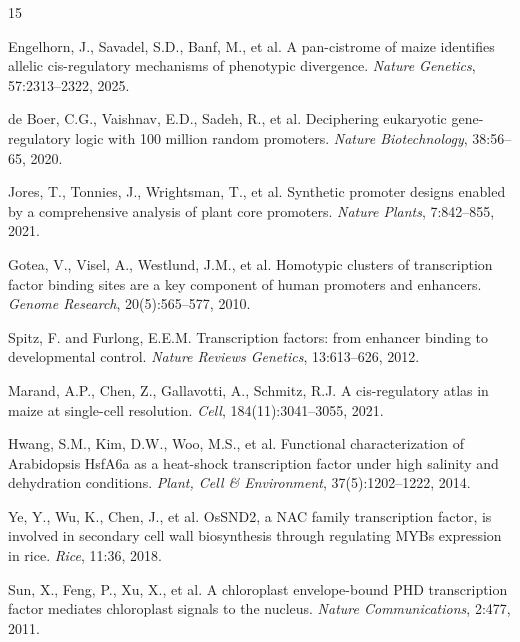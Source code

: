\documentclass[11pt,a4paper]{article}
\begin{document}

\begin{thebibliography}{15}

Engelhorn, J., Savadel, S.D., Banf, M., et al.
\newblock A pan-cistrome of maize identifies allelic cis-regulatory mechanisms of phenotypic divergence.
\newblock \textit{Nature Genetics}, 57:2313--2322, 2025.

de Boer, C.G., Vaishnav, E.D., Sadeh, R., et al.
\newblock Deciphering eukaryotic gene-regulatory logic with 100 million random promoters.
\newblock \textit{Nature Biotechnology}, 38:56--65, 2020.

Jores, T., Tonnies, J., Wrightsman, T., et al.
\newblock Synthetic promoter designs enabled by a comprehensive analysis of plant core promoters.
\newblock \textit{Nature Plants}, 7:842--855, 2021.

Gotea, V., Visel, A., Westlund, J.M., et al.
\newblock Homotypic clusters of transcription factor binding sites are a key component of human promoters and enhancers.
\newblock \textit{Genome Research}, 20(5):565--577, 2010.

Spitz, F. and Furlong, E.E.M.
\newblock Transcription factors: from enhancer binding to developmental control.
\newblock \textit{Nature Reviews Genetics}, 13:613--626, 2012.

Marand, A.P., Chen, Z., Gallavotti, A., Schmitz, R.J.
\newblock A cis-regulatory atlas in maize at single-cell resolution.
\newblock \textit{Cell}, 184(11):3041--3055, 2021.

Hwang, S.M., Kim, D.W., Woo, M.S., et al.
\newblock Functional characterization of Arabidopsis HsfA6a as a heat-shock transcription factor under high salinity and dehydration conditions.
\newblock \textit{Plant, Cell \& Environment}, 37(5):1202--1222, 2014.

Ye, Y., Wu, K., Chen, J., et al.
\newblock OsSND2, a NAC family transcription factor, is involved in secondary cell wall biosynthesis through regulating MYBs expression in rice.
\newblock \textit{Rice}, 11:36, 2018.

Sun, X., Feng, P., Xu, X., et al.
\newblock A chloroplast envelope-bound PHD transcription factor mediates chloroplast signals to the nucleus.
\newblock \textit{Nature Communications}, 2:477, 2011.


\end{thebibliography}
\end{document}
